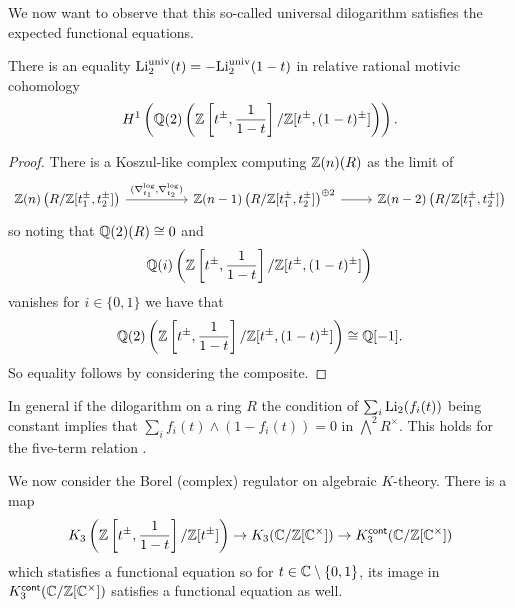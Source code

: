We now want to observe that this so-called universal dilogarithm satisfies the expected functional equations. 
\begin{proposition}\label{prop: equality of the universal dilogarithm}
    There is an equality $\mathrm{Li}_{2}^{\mathrm{univ}}(t)=-\mathrm{Li}_{2}^{\mathrm{univ}}(1-t)$ in relative rational motivic cohomology 
    $$H^{1}\left(\mathbb{Q}(2)\left(\mathbb{Z}\left[t^{\pm},\frac{1}{1-t}\right]/\mathbb{Z}[t^{\pm}, (1-t)^{\pm}]\right)\right).$$ 
\end{proposition}
\begin{proof}
    There is a Koszul-like complex computing $\mathbb{Z}(n)(R)$ as the limit of 
    $$%
    \begin{tikzcd}
        {\ZZ(n)\left(R/\ZZ[t_{1}^{\pm},t_{2}^{\pm}]\right)} && {\ZZ(n-1)\left(R/\ZZ[t_{1}^{\pm},t_{2}^{\pm}]\right)^{\oplus 2}} & {\ZZ(n-2)\left(R/\ZZ[t_{1}^{\pm},t_{2}^{\pm}]\right)}
        \arrow["{(\nabla_{t_{1}}^{\log},\nabla_{t_{2}}^{\log})}", from=1-1, to=1-3]
        \arrow[from=1-3, to=1-4]
    \end{tikzcd}$$
    so noting that $\mathbb{Q}(2)(R)\cong 0$ and 
    $$\mathbb{Q}(i)\left(\mathbb{Z}\left[t^{\pm},\frac{1}{1-t}\right]/\mathbb{Z}[t^{\pm}, (1-t)^{\pm}]\right)$$
    vanishes for $i\in\{0,1\}$ we have that 
    $$\mathbb{Q}(2)\left(\mathbb{Z}\left[t^{\pm},\frac{1}{1-t}\right]/\mathbb{Z}[t^{\pm}, (1-t)^{\pm}]\right)\cong\mathbb{Q}[-1].$$
    So equality follows by considering the composite. 
\end{proof}
\begin{remark}
    In general if the dilogarithm on a ring $R$ the condition of $\sum_{i}\mathrm{Li}_{2}(f_{i}(t))$ being constant implies that $\sum_{i}f_{i}(t)\wedge (1-f_{i}(t))=0$ in $\bigwedge^{2}R^{\times}$. This holds for the five-term relation . 
\end{remark}
We now consider the Borel (complex) regulator on algebraic $K$-theory. There is a map 
$$K_{3}\left(\mathbb{Z}\left[t^{\pm},\frac{1}{1-t}\right]/\mathbb{Z}[t^{\pm}]\right)\to K_{3}(\mathbb{C}/\mathbb{Z}[\mathbb{C}^{\times}])\to K_{3}^{\mathsf{cont}}(\mathbb{C}/\mathbb{Z}[\mathbb{C}^{\times}])$$
which statisfies a functional equation so for $t\in\mathbb{C}\setminus\{0,1\}$, its image in $K_{3}^{\mathsf{cont}}(\mathbb{C}/\mathbb{Z}[\mathbb{C}^{\times}])$ satisfies a functional equation as well. 


